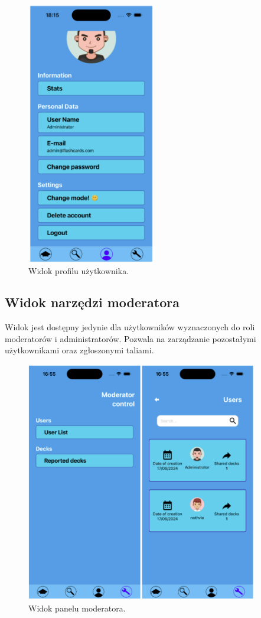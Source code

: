 \begin{figure}[H]
    \centering
    \includegraphics[width=0.5\textwidth]{chapters/chapter_10/images_mobile/mobile_profile}
    \caption{Widok profilu użytkownika.}
    \label{img:mobile_profile}
\end{figure}


\subsection{Widok narzędzi moderatora}
Widok jest dostępny jedynie dla użytkowników wyznaczonych do roli moderatorów i administratorów. Pozwala na zarządzanie pozostałymi użytkownikami oraz zgłoszonymi taliami.


\begin{figure}[H]
    \centering
    \includegraphics[width=0.9\textwidth]{chapters/chapter_10/images_mobile/moderator_panel}
    \caption{Widok panelu moderatora.}
    \label{img:moderator_panel}
\end{figure}